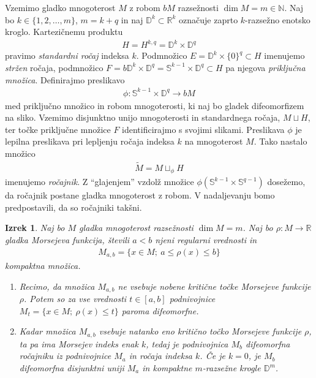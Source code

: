 \documentclass[12pt,a4paper,twoside]{article}
\theoremstyle{definition} %
\theoremstyle{plain} %
\newtheorem{izrek}[definicija]{Izrek}
\numberwithin{equation}{section}  %
\begin{document}
Vzemimo gladko mnogoterost $M$ z robom $bM$ razsežnosti $\dim M = m \in \mathbb{N}$.
Naj bo $k \in \{1, 2, \dots , m\}$, $m = k+q$ in naj $\mathbb{D}^{k} \subset \mathbb{R}^{k}$ označuje zaprto $k$-razsežno enotsko kroglo. Kartezičnemu produktu
\begin{gather*}
H = H^{k,q} = \mathbb{D}^{k} \times \mathbb{D}^{q}
\end{gather*}
pravimo \emph{standardni ročaj} indeksa $k$. Podmnožico $E = \mathbb{D}^{k} \times \{0\}^{q} \subset H$ imenujemo \emph{stržen} ročaja, podmnožico $F = b\mathbb{D}^{k} \times \mathbb{D}^{q} = \mathbb{S}^{k-1} \times \mathbb{D}^{q} \subset H$ pa njegova \emph{priključna množica}. \newline
Definirajmo preslikavo
\begin{gather*}
\phi \colon \mathbb{S}^{k-1} \times \mathbb{D}^{q} \to bM
\end{gather*}
med priključno množico in robom mnogoterosti, ki naj bo gladek difeomorfizem na sliko. Vzemimo disjunktno unijo mnogoterosti in standardnega ročaja, $M \sqcup H$, ter točke priključne množice $F$ identificirajmo s svojimi slikami. Preslikava $\phi$ je lepilna preslikava pri lepljenju ročaja indeksa $k$ na mnogoterost $M$. Tako nastalo množico 
\begin{gather*}
\tilde{M} = M \sqcup_{\phi} H
\end{gather*}
imenujemo \emph{ročajnik}.
Z ``glajenjem'' vzdolž množice $\phi(\mathbb{S}^{k-1} \times \mathbb{S}^{q-1})$ dosežemo, da ročajnik postane gladka mnogoterost z robom. V nadaljevanju bomo predpostavili, da so ročajniki takšni.

\begin{izrek} \label{izr:rocajnik}
Naj bo $M$ gladka mnogoterost razsežnosti $\dim M= m$. Naj bo $\rho \colon M \to \mathbb{R}$ gladka Morsejeva funkcija, števili $a<b$ njeni regularni vrednosti in
\begin{gather*}
M_{a,b} = \{ x \in M; \ a \leq \rho(x) \leq b \}
\end{gather*}
kompaktna množica.
\begin{enumerate}
\item Recimo, da množica $M_{a,b}$ ne vsebuje nobene kritične točke Morsejeve funkcije $\rho$. Potem so za vse vrednosti $t \in [a,b]$ podnivojnice 
	$M_{t} = \{ x \in M; \ \rho(x) \leq t \}$ paroma difeomorfne.
\item Kadar množica $M_{a,b}$ vsebuje natanko eno kritično točko Morsejeve funkcije $\rho$, ta pa ima Morsejev indeks enak $k$, tedaj je podnivojnica 
	$M_{b}$ difeomorfna ročajniku iz podnivojnice $M_{a}$ in ročaja indeksa $k$.
	Če je $k=0$, je $M_{b}$ difeomorfna disjunktni uniji $M_{a}$ in kompaktne $m$-razsežne krogle $\mathbb{D}^{m}$.
\end{enumerate}
\end{izrek}
\end{document}
